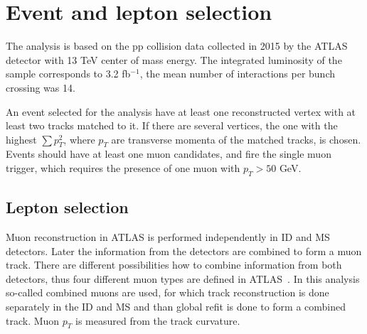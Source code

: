 

\section{Event and lepton selection}
\label{sec:wprimeSelection}

The analysis is based on the pp collision data collected in 2015 by the ATLAS detector with 13 TeV center of mass energy.
The integrated luminosity of the sample corresponds to 3.2 fb$^{-1}$, the mean number of interactions per bunch crossing was 14.

An event selected for the analysis have at least one reconstructed vertex with at least two tracks matched to it. 
If there are several vertices, the one with the highest
$\sum p^2_T$, where $p_T$ are transverse momenta of the matched tracks, is chosen.
Events should have at least one muon candidates, and fire the single muon trigger, 
which requires the presence of one muon with $p_T > 50$ GeV.

\subsection{Lepton selection}
Muon reconstruction in ATLAS is performed independently in ID and MS detectors. 
Later the information from the detectors are combined to form a muon track.
There are different possibilities how to combine information from both detectors, 
thus four different muon types are defined in ATLAS~\cite{muon_performance_2015}.
In this analysis so-called combined muons are used, for which track reconstruction is done 
separately in the ID and MS and than global refit is done to form a combined track.
Muon $p_T$ is measured from the track curvature.


